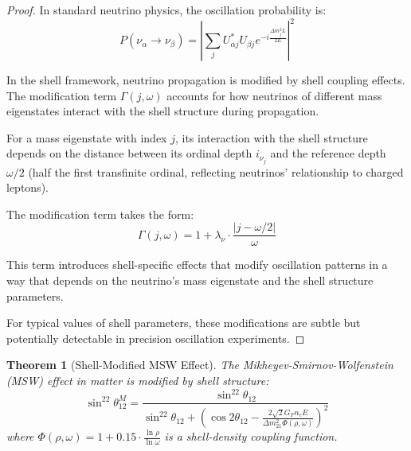 \documentclass[12pt,a4paper]{article}
\newtheorem{theorem}{Theorem}[section]
\begin{document}
\begin{proof}
In standard neutrino physics, the oscillation probability is:
\begin{equation}
P(\nu_\alpha \to \nu_\beta) = \left|\sum_j U_{\alpha j}^* U_{\beta j} e^{-i\frac{\Delta m_j^2 L}{2E}}\right|^2
\end{equation}

In the shell framework, neutrino propagation is modified by shell coupling effects. The modification term $\Gamma(j,\omega)$ accounts for how neutrinos of different mass eigenstates interact with the shell structure during propagation.

For a mass eigenstate with index $j$, its interaction with the shell structure depends on the distance between its ordinal depth $i_{\nu_j}$ and the reference depth $\omega/2$ (half the first transfinite ordinal, reflecting neutrinos' relationship to charged leptons).

The modification term takes the form:
\begin{equation}
\Gamma(j,\omega) = 1 + \lambda_\nu \cdot \frac{|j-\omega/2|}{\omega}
\end{equation}

This term introduces shell-specific effects that modify oscillation patterns in a way that depends on the neutrino's mass eigenstate and the shell structure parameters.

For typical values of shell parameters, these modifications are subtle but potentially detectable in precision oscillation experiments.
\end{proof}

\begin{theorem}[Shell-Modified MSW Effect]
\label{thm:msw-effect}
The Mikheyev-Smirnov-Wolfenstein (MSW) effect in matter is modified by shell structure:
\begin{equation}
\sin^22\theta_{12}^M = \frac{\sin^22\theta_{12}}{\sin^22\theta_{12} + (\cos2\theta_{12} - \frac{2\sqrt{2}G_F n_e E}{\Delta m_{21}^2 \Phi(\rho, \omega)})^2}
\end{equation}
where $\Phi(\rho, \omega) = 1 + 0.15 \cdot \frac{\ln \rho}{\ln \omega}$ is a shell-density coupling function.
\end{theorem}
\end{document}
